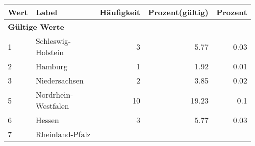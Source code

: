      \begin{longtable}{lXrrr}
     \toprule
     \textbf{Wert} & \textbf{Label} & \textbf{Häufigkeit} & \textbf{Prozent(gültig)} & \textbf{Prozent} \\
     \endhead
     \midrule
     \multicolumn{5}{l}{\textbf{Gültige Werte}}\\

     1 &
     \multicolumn{1}{X}{ Schleswig-Holstein   } &


       \num{3} &
       \num[round-mode=places,round-precision=2]{5,77} &
         \num[round-mode=places,round-precision=2]{0,03} \\

     2 &
     \multicolumn{1}{X}{ Hamburg   } &


       \num{1} &
       \num[round-mode=places,round-precision=2]{1,92} &
         \num[round-mode=places,round-precision=2]{0,01} \\

     3 &
     \multicolumn{1}{X}{ Niedersachsen   } &


       \num{2} &
       \num[round-mode=places,round-precision=2]{3,85} &
         \num[round-mode=places,round-precision=2]{0,02} \\

     5 &
     \multicolumn{1}{X}{ Nordrhein-Westfalen   } &


       \num{10} &
       \num[round-mode=places,round-precision=2]{19,23} &
         \num[round-mode=places,round-precision=2]{0,1} \\

     6 &
     \multicolumn{1}{X}{ Hessen   } &


       \num{3} &
       \num[round-mode=places,round-precision=2]{5,77} &
         \num[round-mode=places,round-precision=2]{0,03} \\

     7 &
     \multicolumn{1}{X}{ Rheinland-Pfalz   } &



\end{longtable}
